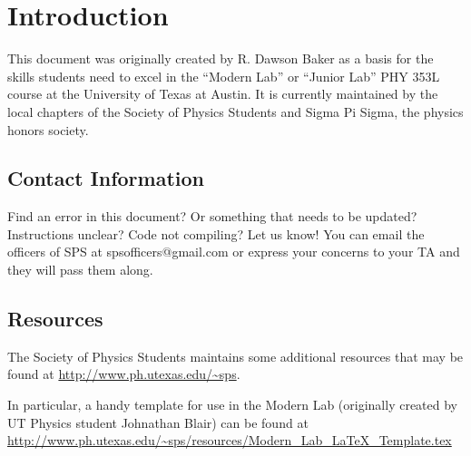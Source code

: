 

\chapter{Introduction}


This document was originally created by R. Dawson Baker as a basis for the skills students need to excel in the ``Modern Lab'' or ``Junior Lab'' PHY 353L course at the University
of Texas at Austin. It is currently maintained by the local chapters of the Society of Physics Students and Sigma Pi Sigma, the physics honors society.

\section{Contact Information}

Find an error in this document? Or something that needs to be updated? Instructions unclear? Code not compiling? Let us know! You can email the officers of SPS at spsofficers@gmail.com
or express your concerns to your TA and they will pass them along.

\section{Resources}

The Society of Physics Students maintains some additional resources that may be found at \url{http://www.ph.utexas.edu/~sps}.

In particular, a handy template for use in the Modern Lab (originally created by UT Physics student Johnathan Blair) can be found at \url{http://www.ph.utexas.edu/~sps/resources/Modern_Lab_LaTeX_Template.tex}